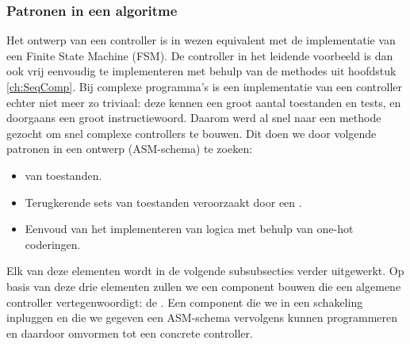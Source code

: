 \subsubsection{Patronen in een algoritme}
Het ontwerp van een controller is in wezen equivalent met de implementatie van een Finite State Machine (FSM). De controller in het leidende voorbeeld is dan ook vrij eenvoudig te implementeren met behulp van de methodes uit hoofdstuk \ref{ch:SeqComp}. Bij complexe programma's is een implementatie van een controller echter niet meer zo triviaal: deze kennen een groot aantal toestanden en tests, en doorgaans een groot instructiewoord. Daarom werd al snel naar een methode gezocht om snel complexe controllers te bouwen. Dit doen we door volgende patronen in een ontwerp (ASM-schema) te zoeken:
\begin{itemize}
 \item {} van toestanden.
 \item Terugkerende sets van toestanden veroorzaakt door een .
 \item Eenvoud van het implementeren van logica met behulp van one-hot coderingen.
\end{itemize}
Elk van deze elementen wordt in de volgende subsubsecties verder uitgewerkt. Op basis van deze drie elementen zullen we een component bouwen die een algemene controller vertegenwoordigt: de . Een component die we in een schakeling inpluggen en die we gegeven een ASM-schema vervolgens kunnen programmeren en daardoor omvormen tot een concrete controller.
